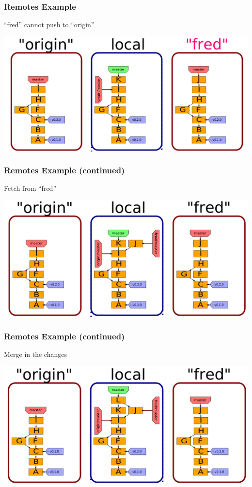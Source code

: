 \documentclass[english,compress]{beamer}
\begin{document}
\begin{frame}[fragile]
    \frametitle{Remotes Example}
	``fred'' cannot push to ``origin''

	\begin{center}
		\includegraphics[width=.8\textwidth]{figs/several-remotes}
	\end{center}
\end{frame}

\begin{frame}[fragile]
    \frametitle{Remotes Example (continued)}
	Fetch from ``fred''

	\begin{center}
		\includegraphics[width=.8\textwidth]{figs/fetch-fred}
	\end{center}
\end{frame}

\begin{frame}[fragile]
    \frametitle{Remotes Example (continued)}
	Merge in the changes

	\begin{center}
		\includegraphics[width=.8\textwidth]{figs/merge-fred}
	\end{center}
\end{frame}
\end{document}
